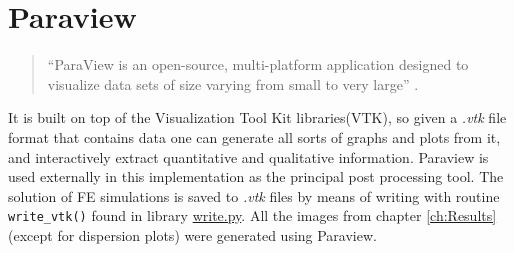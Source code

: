 \section{Paraview}
\begin{quote}``ParaView is an open-source, multi-platform application designed to visualize data sets of size varying from small to very large'' \cite{Henderson2007, ParaviewDoc}.\end{quote}
It is built on top of the Visualization Tool Kit libraries(VTK), so given a \textit{.vtk} file format that contains data one can generate all sorts of graphs and plots from it, and interactively extract quantitative and qualitative information. 
Paraview is used externally in this implementation as the principal post processing tool. The  solution of FE simulations is saved to \textit{.vtk} files by means of writing with routine \verb|write_vtk()| found in library \href{https://github.com/bebopsan/peyeQM/blob/Depuration/Lib/OOPyQM/write.py}{write.py}. All the images from chapter \ref{ch:Results} (except for dispersion plots) were generated using Paraview.



